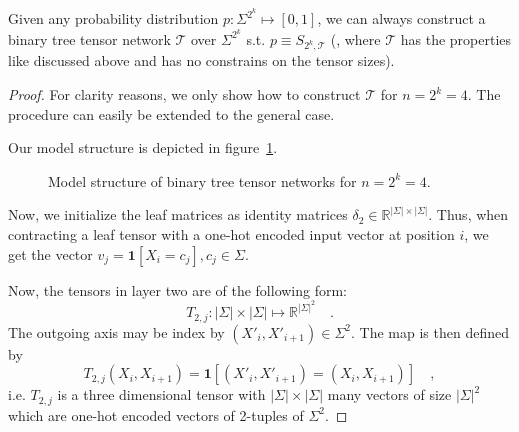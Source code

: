 \documentclass[../../main.tex]{subfiles}
\begin{document}
    \begin{proposition}
        Given any probability distribution $p: \Sigma^{2^k} \mapsto [0,1]$, we can always construct a binary tree tensor network $\mathcal{T}$ over $\Sigma^{2^k}$ s.t. $p \equiv S_{2^k, \mathcal{T}}$ (, where $\mathcal{T}$ has the properties like discussed above and has no constrains on the tensor sizes).
    \end{proposition}
    \vspace{-2.5em}
    \begin{proof}
        For clarity reasons, we only show how to construct $\mathcal{T}$ for $n = 2^k = 4$. The procedure can easily be extended to the general case.

        Our model structure is depicted in figure~\ref{fig:binary_tree_tensor_network_n_equals_four}.

        \begin{figure}[h]
        \centering
        \caption{Model structure of binary tree tensor networks for $n = 2^k = 4$.}
        \label{fig:binary_tree_tensor_network_n_equals_four}
    \end{figure}

    Now, we initialize the leaf matrices as identity matrices $\delta_2 \in \mathbb{R}^{|\Sigma| \times |\Sigma|}$. Thus, when contracting a leaf tensor with a one-hot encoded input vector at position $i$, we get the vector $v_j = \bm{1}[X_i = c_j], c_j \in \Sigma$.

    Now, the tensors in layer two are of the following form:
    \[
    T_{2, j}: |\Sigma| \times |\Sigma| \mapsto \mathbb{R}^{|\Sigma|^2} \quad .
    \]
    The outgoing axis may be index by $(X'_i, X'_{i + 1}) \in \Sigma^2$. The map is then defined by
    \[
        T_{2, j}(X_i, X_{i + 1}) = \bm{1}[(X'_i, X'_{i + 1}) = (X_i, X_{i + 1})] \quad ,
    \]
    i.e. $T_{2, j}$ is a three dimensional tensor with $|\Sigma| \times |\Sigma|$ many vectors of size $|\Sigma|^2$ which are one-hot encoded vectors of 2-tuples of $\Sigma^2$.


\end{proof}
\end{document}
